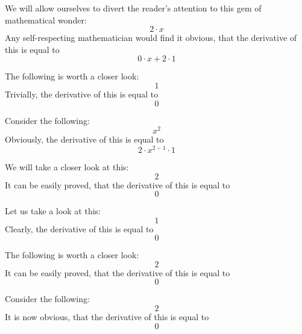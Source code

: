 \documentclass{article}
\begin{document}
We will allow ourselves to divert the reader's attention to this gem of mathematical wonder:
\begin{equation}
2 \cdot x 
\end{equation}
Any self-respecting mathematician would find it obvious, that the derivative of this is equal to
\begin{equation}
0 \cdot x + 2 \cdot 1 
\end{equation}

The following is worth a closer look:
\begin{equation}
1 
\end{equation}
Trivially, the derivative of this is equal to
\begin{equation}
0 
\end{equation}

Consider the following:
\begin{equation}
x ^{2 } 
\end{equation}
Obviously, the derivative of this is equal to
\begin{equation}
2 \cdot x ^{2 - 1 } \cdot 1 
\end{equation}

We will take a closer look at this:
\begin{equation}
2 
\end{equation}
It can be easily proved, that the derivative of this is equal to
\begin{equation}
0 
\end{equation}

Let us take a look at this:
\begin{equation}
1 
\end{equation}
Clearly, the derivative of this is equal to
\begin{equation}
0 
\end{equation}

The following is worth a closer look:
\begin{equation}
2 
\end{equation}
It can be easily proved, that the derivative of this is equal to
\begin{equation}
0 
\end{equation}

Consider the following:
\begin{equation}
2 
\end{equation}
It is now obvious, that the derivative of this is equal to
\begin{equation}
0 
\end{equation}
\end{document}
